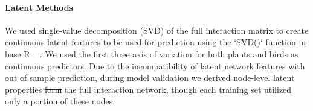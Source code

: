 \documentclass[num-refs]{article}%
\providecommand{\DIFadd}[1]{{\protect\color{blue}\uwave{#1}}} %
\providecommand{\DIFdel}[1]{{\protect\color{red}\sout{#1}}}                      %
\providecommand{\DIFaddbegin}{} %
\providecommand{\DIFaddend}{} %
\providecommand{\DIFdelbegin}{} %
\providecommand{\DIFdelend}{} %
\newcommand{\DIFscaledelfig}{0.5}
\newlength{\DIFdelgraphicswidth} %
\newlength{\DIFdelgraphicsheight} %
\newcommand{\DIFaddincludegraphics}[2][]{{\color{blue}\fbox{\DIFOincludegraphics[#1]{#2}}}} %
\newcommand{\DIFdelincludegraphics}[2][]{%
\sbox{\DIFdelgraphicsbox}{\DIFOincludegraphics[#1]{#2}}%
\settoboxwidth{\DIFdelgraphicswidth}{\DIFdelgraphicsbox} %
\settoboxtotalheight{\DIFdelgraphicsheight}{\DIFdelgraphicsbox} %
\scalebox{\DIFscaledelfig}{%
\parbox[b]{\DIFdelgraphicswidth}{\usebox{\DIFdelgraphicsbox}\\[-\baselineskip] \rule{\DIFdelgraphicswidth}{0em}}\llap{\resizebox{\DIFdelgraphicswidth}{\DIFdelgraphicsheight}{%
\setlength{\unitlength}{\DIFdelgraphicswidth}%
\begin{picture}(1,1)%
\thicklines\linethickness{2pt} %
{\color[rgb]{1,0,0}\put(0,0){\framebox(1,1){}}}%
{\color[rgb]{1,0,0}\put(0,0){\line( 1,1){1}}}%
{\color[rgb]{1,0,0}\put(0,1){\line(1,-1){1}}}%
\end{picture}%
}\hspace*{3pt}}} %
} %
\DeclareRobustCommand{\DIFaddbegin}{\DIFOaddbegin \let\includegraphics\DIFaddincludegraphics} %
\DeclareRobustCommand{\DIFaddend}{\DIFOaddend \let\includegraphics\DIFOincludegraphics} %
\DeclareRobustCommand{\DIFdelbegin}{\DIFOdelbegin \let\includegraphics\DIFdelincludegraphics} %
\DeclareRobustCommand{\DIFdelend}{\DIFOaddend \let\includegraphics\DIFOincludegraphics} %
\begin{document}
\paragraph{Latent Methods} We used single-value decomposition (SVD) of the full interaction matrix to create continuous latent features to be used for prediction using the `SVD()` function in base R \DIFdelbegin \DIFdel{\mbox{%
\cite{RCore}}\hspace{0pt}%
}\DIFdelend \DIFaddbegin \DIFadd{\mbox{%
\citep{RCore}}\hspace{0pt}%
}\DIFaddend . We used the first three axis of variation for both plants and birds as continuous predictors. Due to the incompatibility of latent network features with out of sample prediction, during model validation we derived node-level latent properties \DIFdelbegin \DIFdel{form }\DIFdelend \DIFaddbegin \DIFadd{from }\DIFaddend the full interaction network, though each training set utilized only a portion of these nodes. 
\end{document}
